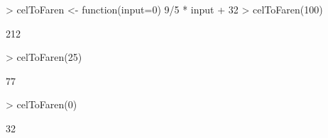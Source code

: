 \begin{Schunk}
\begin{Sinput}
> celToFaren <- function(input=0){ 9/5 * input + 32 }
> celToFaren(100)
\end{Sinput}
\begin{Soutput}
[1] 212
\end{Soutput}
\begin{Sinput}
> celToFaren(25)
\end{Sinput}
\begin{Soutput}
[1] 77
\end{Soutput}
\begin{Sinput}
> celToFaren(0)
\end{Sinput}
\begin{Soutput}
[1] 32
\end{Soutput}
\end{Schunk}
